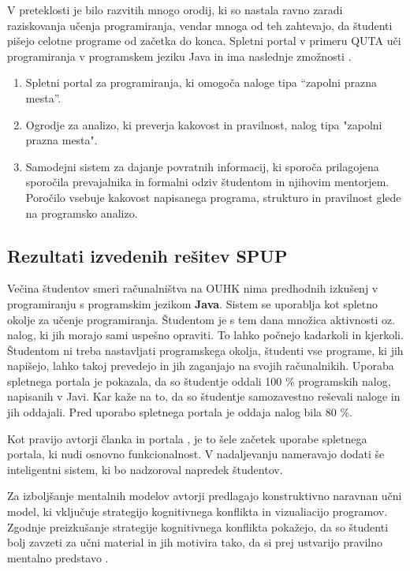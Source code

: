 V preteklosti je bilo razvitih mnogo orodij, ki so nastala ravno zaradi
raziskovanja učenja programiranja, vendar mnoga od teh zahtevajo, da
študenti pišejo celotne programe od začetka do konca. Spletni portal
v primeru QUTA uči programiranja v programskem jeziku Java in ima
 naslednje zmožnosti \cite{thesisAWebP}.

\begin{enumerate}
\tightlist
\item Spletni portal za programiranja, ki omogoča naloge tipa ``zapolni
   prazna mesta''. %
\item Ogrodje za analizo, ki preverja kakovost in pravilnost, nalog
   tipa "zapolni prazna mesta".
\item  Samodejni sistem za dajanje povratnih informacij, ki sporoča
   prilagojena sporočila prevajalnika in formalni odziv študentom in
   njihovim mentorjem. Poročilo vsebuje kakovost napisanega programa,
   strukturo in pravilnost glede na programsko analizo.
\end{enumerate}

\subsection{Rezultati izvedenih rešitev SPUP}
\label{sec:rezultati_izvedenih_rešitev}

Večina študentov smeri računalništva na OUHK nima predhodnih izkušenj
v programiranju s programskim jezikom \textbf{Java}. Sistem se
uporablja kot spletno okolje za učenje programiranja. Študentom je s
tem dana množica aktivnosti oz. nalog, ki jih morajo sami uspešno
opraviti. To lahko počnejo kadarkoli in kjerkoli. Študentom ni
treba nastavljati programskega okolja, študenti vse programe, ki
jih napišejo, lahko takoj prevedejo in jih zaganjajo na svojih
računalnikih. Uporaba spletnega portala je pokazala, da so študentje
oddali 100 \% programskih nalog, napisanih v Javi. Kar kaže na to, da so
študentje samozavestno reševali naloge in jih oddajali. Pred uporabo
spletnega portala je oddaja nalog bila 80 \%.

Kot pravijo avtorji članka in portala \cite{ITaLCP_DistanceEdu}, je to
šele začetek uporabe spletnega portala, ki nudi osnovno
funkcionalnost. V nadaljevanju nameravajo dodati še inteligentni
sistem, ki bo nadzoroval napredek študentov.

Za izboljšanje mentalnih modelov avtorji predlagajo konstruktivno
naravnan učni model, ki vključuje strategijo kognitivnega konflikta in
vizualiacijo programov. Zgodnje preizkušanje strategije kognitivnega
konflikta pokažejo, da so študenti bolj zavzeti za učni material in jih
motivira tako, da si prej ustvarijo pravilno mentalno predstavo
\cite{mentalModels}.

